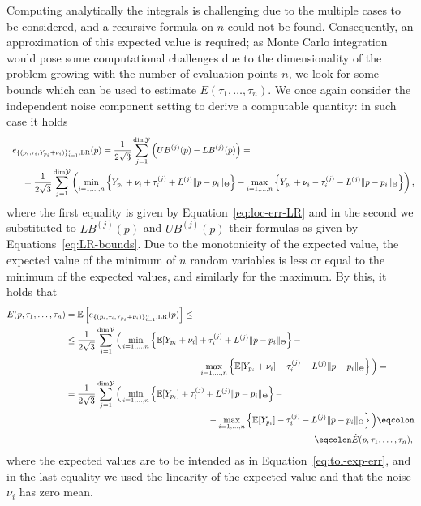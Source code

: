 Computing analytically the integrals is challenging due to the multiple cases to be considered, and a recursive formula on $n$ could not be found. 
Consequently, an approximation of this expected value is required; as Monte Carlo integration would pose some computational challenges due to the dimensionality of the problem growing with the number of evaluation points $n$, we look for some bounds which can be used to estimate $E(\tau_1,\dots, \tau_n)$.\newline
We once again consider the independent noise component setting to derive a computable quantity: in such case it holds
\begin{gather*}
    e_{\{(p_i,\tau_{i}, Y_{p_i} + \nu_i )\}_{i=1}^n, \text{LR}}(p)  = 
    \frac{1}{2\sqrt{3}} \sum_{j=1}^{\text{dim}\mathcal Y} \left( UB^{(j)}(p) - LB^{(j)}(p) \right) = \qquad \qquad \qquad \qquad \qquad\qquad \qquad\qquad \qquad  \\
    \qquad = \frac{1}{2\sqrt{3}} \sum_{j=1}^{\text{dim}\mathcal Y} 
    \left( \min_{i=1,\dots,n}\left\{ Y_{p_i} + \nu_i + \tau_{i}^{(j)} + L^{(j)} \| p - p_i \|_\Theta \right\}- \max_{i=1,\dots,n} \left\{ Y_{p_i} + \nu_i - \tau_i^{(j)} - L^{(j)} \| p - p_i \|_\Theta \right\} \right),
\end{gather*} 
where the first equality is given by Equation~\eqref{eq:loc-err-LR} and in the second we substituted to $LB^{(j)}(p)$ and $UB^{(j)}(p)$ their formulas as given by Equations~\eqref{eq:LR-bounds}.\newline
Due to the monotonicity of the expected value, the expected value of the minimum of $n$ random variables is less or equal to the minimum of the expected values, and similarly for the maximum. 
By this, it holds that 
\begin{align*}
    E(p, \tau_1, \dots, \tau_n) &=\bb E\left[ 
        e_{\{(p_i,\tau_{i}, Y_{p_i} + \nu_i )\}_{i=1}^n, \text{LR}}(p)
   \right] \leq\\
   &\leq \frac{1}{2\sqrt{3}} \sum_{j=1}^{\text{dim}\mc Y} 
    \Big( \min_{i=1,\dots,n}\left\{ \bb E[Y_{p_i} + \nu_i] + \tau_i^{(j)} + L^{(j)} \| p - p_i \|_\Theta \right\}- \\
    & \qquad\qquad \qquad\qquad\qquad \qquad \qquad -\max_{i=1,\dots,n} \left\{ \bb E[Y_{p_i} + \nu_i] - \tau_i^{(j)} - L^{(j)} \| p - p_i \|_\Theta \right\} \Big) = \\
    &= \frac{1}{2\sqrt{3}} \sum_{j=1}^{\text{dim}\mc Y} \Big(  \min_{i=1,\dots, n}\left\{ \bb E[Y_{p_i}] + \tau_i^{(j)} + L^{(j)} \| p - p_i \|_\Theta \right\}- \\
    & \qquad\qquad\qquad \qquad\qquad\qquad \qquad \qquad - \max_{i=1,\dots,n} \left\{ \bb E[Y_{p_i} ] - \tau_i^{(j)} - L^{(j)} \| p - p_i \|_\Theta \right\} \Big)\eqcolon \\ 
    & \qquad\qquad \qquad\qquad\qquad \qquad \qquad  \qquad\qquad \qquad\qquad\qquad \qquad \qquad 
     \eqcolon\hat E(p, \tau_1, \dots, \tau_n),
\end{align*}
where the expected values are to be intended as in Equation~\eqref{eq:tol-exp-err}, and in the last equality we used the linearity of the expected value and that the noise $\nu_i$ has zero mean. \medbreak

